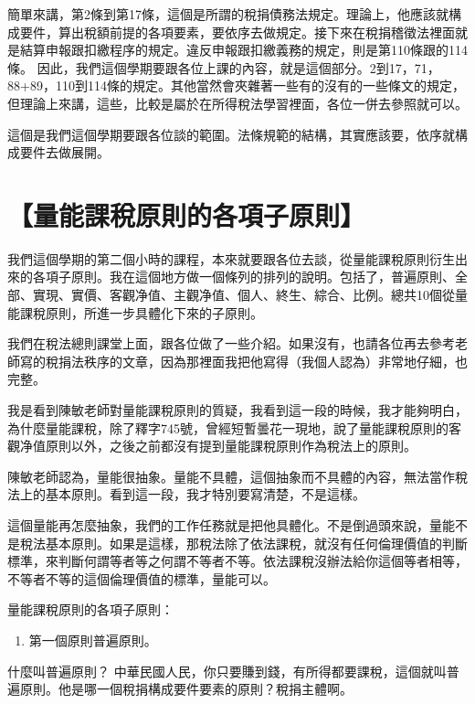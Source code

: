 \documentclass[]{ctexbook}
\providecommand{\tightlist}{%
  \setlength{\itemsep}{0pt}\setlength{\parskip}{0pt}}
\begin{document}
簡單來講，第2條到第17條，這個是所謂的稅捐債務法規定。理論上，他應該就構成要件，算出稅額前提的各項要素，要依序去做規定。接下來在稅捐稽徵法裡面就是結算申報跟扣繳程序的規定。違反申報跟扣繳義務的規定，則是第110條跟的114條。
因此，我們這個學期要跟各位上課的內容，就是這個部分。2到17，71，88+89，110到114條的規定。其他當然會夾雜著一些有的沒有的一些條文的規定，但理論上來講，這些，比較是屬於在所得稅法學習裡面，各位一併去參照就可以。

這個是我們這個學期要跟各位談的範圍。法條規範的結構，其實應該要，依序就構成要件去做展開。

\hypertarget{ux91cfux80fdux8ab2ux7a05ux539fux5247ux7684ux5404ux9805ux5b50ux539fux5247}{%
\section{【量能課稅原則的各項子原則】}\label{ux91cfux80fdux8ab2ux7a05ux539fux5247ux7684ux5404ux9805ux5b50ux539fux5247}}

我們這個學期的第二個小時的課程，本來就要跟各位去談，從量能課稅原則衍生出來的各項子原則。我在這個地方做一個條列的排列的說明。包括了，普遍原則、全部、實現、實價、客觀净值、主觀净值、個人、終生、綜合、比例。總共10個從量能課稅原則，所進一步具體化下來的子原則。

我們在稅法總則課堂上面，跟各位做了一些介紹。如果沒有，也請各位再去參考老師寫的稅捐法秩序的文章，因為那裡面我把他寫得（我個人認為）非常地仔細，也完整。

我是看到陳敏老師對量能課稅原則的質疑，我看到這一段的時候，我才能夠明白，為什麼量能課稅，除了釋字745號，曾經短暫曇花一現地，說了量能課稅原則的客觀净值原則以外，之後之前都沒有提到量能課稅原則作為稅法上的原則。

陳敏老師認為，量能很抽象。量能不具體，這個抽象而不具體的內容，無法當作稅法上的基本原則。看到這一段，我才特別要寫清楚，不是這樣。

這個量能再怎麼抽象，我們的工作任務就是把他具體化。不是倒過頭來說，量能不是稅法基本原則。如果是這樣，那稅法除了依法課稅，就沒有任何倫理價值的判斷標準，來判斷何謂等者等之何謂不等者不等。依法課稅沒辦法給你這個等者相等，不等者不等的這個倫理價值的標準，量能可以。

量能課稅原則的各項子原則：

\begin{enumerate}
\def\labelenumi{\arabic{enumi}.}
\tightlist
\item
  第一個原則普遍原則。
\end{enumerate}

什麼叫普遍原則？ 中華民國人民，你只要賺到錢，有所得都要課稅，這個就叫普遍原則。他是哪一個稅捐構成要件要素的原則？稅捐主體啊。
\end{document}
